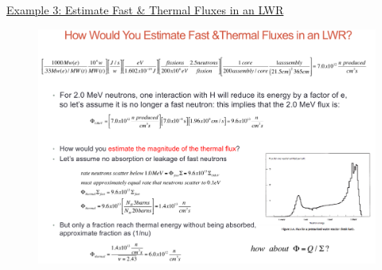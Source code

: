 \documentclass{school-22.211-notes}
\begin{document}
\uline{Example 3: Estimate Fast \& Thermal Fluxes in an LWR}
\begin{figure}[ht]
  \centering
  \includegraphics[width=4.5in]{images/lec1-example3.png}
\end{figure}



\end{document}
